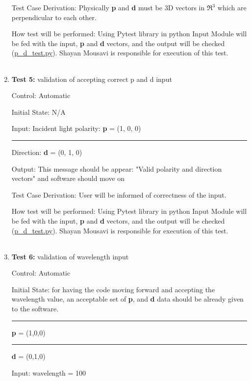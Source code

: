 \documentclass[12pt, titlepage]{article}
\begin{document}
\begin{enumerate}
Test Case Derivation: Physically \textbf{p} and \textbf{d} must be 3D vectors in $\Re^3$ which are perpendicular to each other.

How test will be performed: Using Pytest library in python Input Module will be fed with the input, \textbf{p} and \textbf{d} vectors, and the output will be checked (\href{https://github.com/shmouses/SPDFM/tree/master/src}{p\_d\_test.py}). Shayan Mousavi is responsible for execution of this test.
\\
\\

\item{\textbf{Test 5:} validation of accepting correct p and d input\\}

Control: Automatic

Initial State: N/A

Input: Incident light polarity: \textbf{p} = (1, 0, 0)\\
\rule{1.15cm}{0pt} Direction: \textbf{d} = (0, 1, 0)

Output: This message should be appear: "Valid polarity and direction vectors" and software should move on

Test Case Derivation: User will be informed of correctness of the input.

How test will be performed: Using Pytest library in python Input Module will be fed with the input, \textbf{p} and \textbf{d} vectors, and the output will be checked (\href{https://github.com/shmouses/SPDFM/tree/master/src}{p\_d\_test.py}). Shayan Mousavi is responsible for execution of this test.
\\
\\

\item{\textbf{Test 6:} validation of wavelength input\\}

Control: Automatic

Initial State: for having the code moving forward and accepting the wavelength value, an acceptable set of \textbf{p}, and \textbf{d} data should be already given to the software.\\ 
\rule{2.3cm}{0pt} \textbf{p} = (1,0,0)\\
\rule{2.3cm}{0pt} \textbf{d} = (0,1,0)

Input: wavelength = 100


\end{enumerate}
\end{document}
